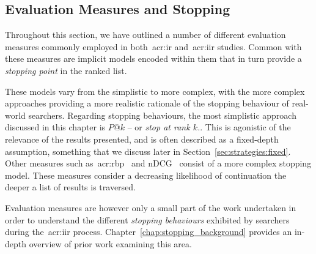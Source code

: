 %
%

\subsection{Evaluation Measures and Stopping}
Throughout this section, we have outlined a number of different evaluation measures commonly employed in both~\gls{acr:ir} and~\gls{acr:iir} studies. Common with these measures are implicit models encoded within them that in turn provide a \emph{stopping point} in the ranked list.

These models vary from the simplistic to more complex, with the more complex approaches providing a more realistic rationale of the stopping behaviour of real-world searchers. Regarding stopping behaviours, the most simplistic approach discussed in this chapter is $P@k$ -- or \emph{stop at rank $k$.}. This is agonistic of the relevance of the results presented, and is often described as a fixed-depth assumption, something that we discuss later in Section~\ref{sec:strategies:fixed}. Other measures such as~\gls{acr:rbp}~\citep{moffat2008rbp} and nDCG~\citep{jarvelin2002cg} consist of a more complex stopping model. These measures consider a decreasing likelihood of continuation the deeper a list of results is traversed.

Evaluation measures are however only a small part of the work undertaken in order to understand the different \emph{stopping behaviours} exhibited by searchers during the~\gls{acr:iir} process. Chapter~\ref{chap:stopping_background} provides an in-depth overview of prior work examining this area.

